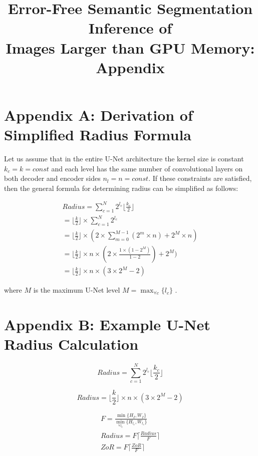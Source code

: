 \documentclass[letterpaper]{article} %
\title{Error-Free Semantic Segmentation Inference of \\
	Images Larger than GPU Memory: Appendix}
\begin{document}
\maketitle

\section{Appendix A: Derivation of Simplified Radius Formula}

Let us assume that in the entire U-Net architecture the kernel size is constant $k_{c} = k = const$ and each level has the same number of convolutional layers on both decoder and encoder sides $n_{l} = n = const$. If these constraints are satisfied, then the general formula for determining radius can be simplified as follows:

\begin{equation}
\begin{aligned}
Radius = \sum_{c=1}^{N} 2^{l_c} \lfloor \frac{k_c}{2} \rfloor \\
= \lfloor \frac{k}{2} \rfloor \times \sum_{c=1}^{N} 2^{l_c} \\
= \lfloor \frac{k}{2} \rfloor \times ( 2 \times \sum_{m=0}^{M-1} (2^{m} \times n) + 2^{M} \times n )  \\
= \lfloor \frac{k}{2} \rfloor \times n \times ( 2 \times \frac{1 \times (1 - 2^M) }{ 1- 2} ) + 2^{M} )  \\
= \lfloor \frac{k}{2} \rfloor \times n \times (3 \times 2^{M} - 2) 
\end{aligned}
\end{equation}

where $M$ is the maximum U-Net level $M = \max_{\forall c}\{ l_{c} \}$ .


\section{Appendix B: Example U-Net Radius Calculation}

\begin{equation}
Radius = \sum_{c=1}^{N} 2^{l_c} \lfloor \frac{k_c}{2} \rfloor
\label{eq:radius}
\end{equation}

\begin{equation}
Radius = \lfloor \frac{k}{2} \rfloor \times n \times (3 \times 2^{M} - 2)
\label{eq:radius2}
\end{equation}

\begin{equation}
\begin{aligned}
F = \frac{ \min\{H_{I}, W_{I} \} }{ \min_{\forall l_{c}} \{ H_{l_{c}}, W_{l_{c}} \} } \\
Radius = F \lceil \frac{Radius}{F} \rceil \\
ZoR = F \lceil \frac{ZoR}{F} \rceil 
\end{aligned}
\label{eq:constraints}
\end{equation}
\end{document}
